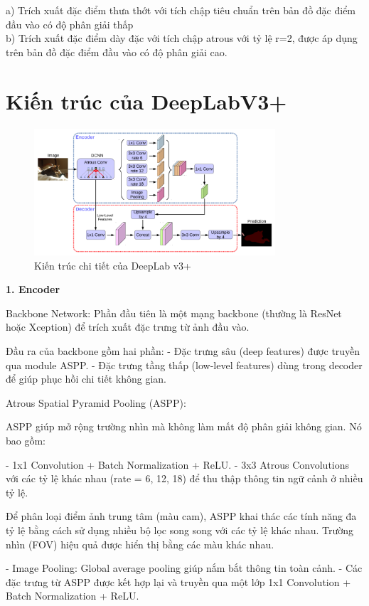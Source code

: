 \documentclass[12pt]{report}
\begin{document}
\noindent
a) Trích xuất đặc điểm thưa thớt với tích chập tiêu chuẩn trên bản đồ đặc điểm đầu vào có độ phân giải thấp\\
b) Trích xuất đặc điểm dày đặc với tích chập atrous với tỷ lệ r=2, được áp dụng trên bản đồ đặc điểm đầu vào có độ phân giải cao.


\section*{Kiến trúc của DeepLabV3+}

\begin{figure}[h]
    \centering
    \includegraphics[width=0.8\textwidth]{deeplabv3plus-architecture.png}
    \caption{Kiến trúc chi tiết của DeepLab v3+}
\end{figure}

\textbf{1. Encoder}

Backbone Network:
Phần đầu tiên là một mạng backbone (thường là ResNet hoặc Xception) để trích xuất đặc trưng từ ảnh đầu vào.

Đầu ra của backbone gồm hai phần:
- Đặc trưng sâu (deep features) được truyền qua module ASPP.
- Đặc trưng tầng thấp (low-level features) dùng trong decoder để giúp phục hồi chi tiết không gian.

Atrous Spatial Pyramid Pooling (ASPP):

ASPP giúp mở rộng trường nhìn mà không làm mất độ phân giải không gian. Nó bao gồm:

- 1x1 Convolution + Batch Normalization + ReLU.
- 3x3 Atrous Convolutions với các tỷ lệ khác nhau (rate = 6, 12, 18) để thu thập thông tin ngữ cảnh ở nhiều tỷ lệ.

Để phân loại điểm ảnh trung tâm (màu cam), ASPP khai thác các tính năng đa tỷ lệ bằng cách sử dụng nhiều bộ lọc song song với các tỷ lệ khác nhau. Trường nhìn (FOV) hiệu quả được hiển thị bằng các màu khác nhau.

- Image Pooling: Global average pooling giúp nắm bắt thông tin toàn cảnh.
- Các đặc trưng từ ASPP được kết hợp lại và truyền qua một lớp 1x1 Convolution + Batch Normalization + ReLU.
\end{document}
